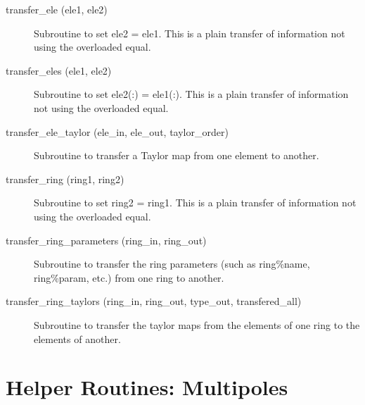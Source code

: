 \begin{description}
\item[transfer\_ele (ele1, ele2)] \Newline 
     Subroutine to set ele2 = ele1. 
     This is a plain transfer of information not using the overloaded equal.

\item[transfer\_eles (ele1, ele2)] \Newline 
     Subroutine to set ele2(:) = ele1(:). 
     This is a plain transfer of information not using the overloaded equal.

\item[transfer\_ele\_taylor (ele\_in, ele\_out, taylor\_order)] \Newline 
     Subroutine to transfer a Taylor map from one element to another.

\item[transfer\_ring (ring1, ring2)] \Newline 
     Subroutine to set ring2 = ring1. 
     This is a plain transfer of information not using the overloaded equal.

\item[transfer\_ring\_parameters (ring\_in, ring\_out)] \Newline
Subroutine to transfer the ring parameters (such as ring\%name, 
ring\%param, etc.) from one ring to another. 

\item[transfer\_ring\_taylors (ring\_in, ring\_out, 
                        type\_out, transfered\_all) ] \Newline 
Subroutine to transfer the taylor maps from the elements of one ring to
the elements of another. 

\end{description}

\section{Helper Routines: Multipoles}
\label{r:multi}    

